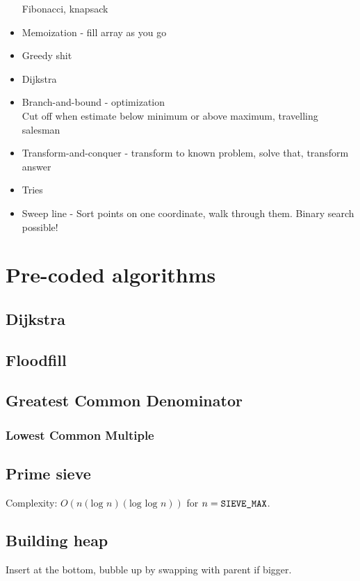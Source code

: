 \documentclass[10pt,hidelinks]{article}
\begin{document}
\begin{itemize}
	Fibonacci, knapsack
\item Memoization - fill array as you go
\item Greedy shit
\item Dijkstra
\item Branch-and-bound - optimization \\
	Cut off when estimate below minimum or above maximum, travelling salesman
\item Transform-and-conquer - transform to known problem, solve that, transform answer
\item Tries
\item Sweep line - Sort points on one coordinate, walk through them. Binary search possible!
\end{itemize}

\section{Pre-coded algorithms}

\subsection{Dijkstra}


\subsection{Floodfill}


\subsection{Greatest Common Denominator}


\subsubsection{Lowest Common Multiple}


\subsection{Prime sieve}
Complexity: $O(n(\text{log }n)(\text{log log }n))$ for $n = \text{\texttt{SIEVE\_MAX}}$.


\subsection{Building heap}
Insert at the bottom, bubble up by swapping with parent if bigger.
\end{document}
